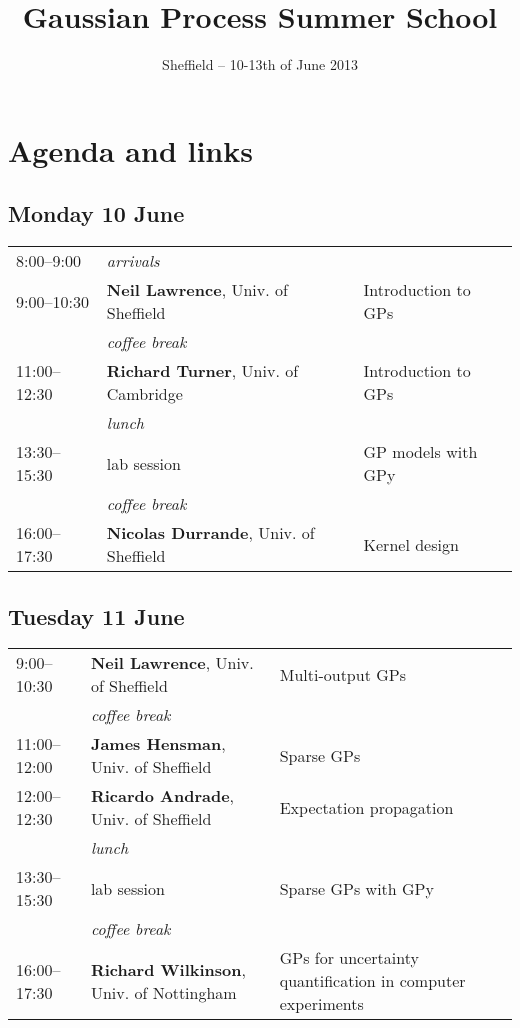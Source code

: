 \documentclass{article}
\title{Gaussian Process Summer School}
\author{Sheffield -- 10-13th of June 2013}
\date{\null}
\begin{document}
\section*{Agenda and links}
\doublespacing

\subsection*{\textcolor{MyDarkBlue}{Monday 10 June}}
\begin{tabular}{l p{6.5cm} p{7.75cm}}
 8:00--9:00 & \textit{arrivals} & \\
 9:00--10:30 & \textbf{Neil Lawrence}, Univ. of Sheffield & Introduction to GPs \\
 & \textit{coffee break} & \\
11:00--12:30 & \textbf{Richard Turner}, Univ. of Cambridge & Introduction to GPs \\
& \textit{lunch} & \\
13:30--15:30 & lab session & GP models with GPy \\
& \textit{coffee break} & \\
16:00--17:30 & \textbf{Nicolas Durrande}, Univ. of Sheffield & Kernel design \\
\end{tabular}

\vspace{0.5cm}
\subsection*{\textcolor{MyDarkBlue}{Tuesday 11 June}}
\begin{tabular}{l p{6.5cm} p{7.75cm}}
9:00--10:30 & \textbf{Neil Lawrence}, Univ. of Sheffield  & Multi-output GPs \\
 & \textit{coffee break} & \\
11:00--12:00 & \textbf{James Hensman}, Univ. of Sheffield & Sparse GPs \\
12:00--12:30 & \textbf{Ricardo Andrade}, Univ. of Sheffield & Expectation propagation \\
& \textit{lunch} & \\
13:30--15:30 & lab session & Sparse GPs with GPy \\
 & \textit{coffee break} & \\
16:00--17:30 & \textbf{Richard Wilkinson}, Univ. of Nottingham & GPs for uncertainty quantification in computer experiments \\
\end{tabular}
\end{document}
